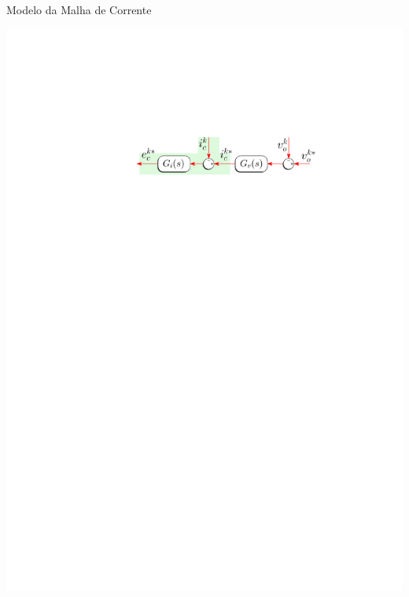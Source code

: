 




\begin{frame}{Modelo da Malha de Corrente}



\centering
\includegraphics[width=0.65\linewidth]{./figuras/figuras_nrf/CTRL_I}

\vspace*{1.0cm}

\begin{columns}

\centering


\end{columns}
\end{frame}

